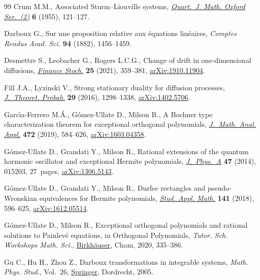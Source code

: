 \begin{thebibliography}{99}
Crum M.M., Associated {S}turm--{L}iouville systems,
 \href{https://doi.org/10.1093/qmath/6.1.121}{\textit{Quart.~J. Math. Oxford
 Ser.~(2)}} \textbf{6} (1955), 121--127.

Darboux G., Sur une proposition relative aux \'equations lin\'eaires,
 \textit{Comptes Rendus Acad. Sci.} \textbf{94} (1882), 1456--1459.

Desmettre S., Leobacher G., Rogers L.C.G., Change of drift in one-dimensional
 diffusions, \href{https://doi.org/10.1007/s00780-021-00451-w}{\textit{Finance
 Stoch.}} \textbf{25} (2021), 359--381,
 \href{http://arxiv.org/abs/1910.11904}{arXiv:1910.11904}.

Fill J.A., Lyzinski V., Strong stationary duality for diffusion processes,
 \href{https://doi.org/10.1007/s10959-015-0612-1}{\textit{J.~Theoret.
 Probab.}} \textbf{29} (2016), 1298--1338,
 \href{http://arxiv.org/abs/1402.5706}{arXiv:1402.5706}.

Garc\'{\i}a-Ferrero M.{\'A}., G\'omez-Ullate D., Milson R., A {B}ochner type
 characterization theorem for exceptional orthogonal polynomials,
 \href{https://doi.org/10.1016/j.jmaa.2018.11.042}{\textit{J.~Math. Anal.
 Appl.}} \textbf{472} (2019), 584--626,
 \href{http://arxiv.org/abs/1603.04358}{arXiv:1603.04358}.

G\'omez-Ullate D., Grandati Y., Milson R., Rational extensions of the quantum
 harmonic oscillator and exceptional {H}ermite polynomials,
 \href{https://doi.org/10.1088/1751-8113/47/1/015203}{\textit{J.~Phys.~A}}
 \textbf{47} (2014), 015203, 27~pages,
 \href{http://arxiv.org/abs/1306.5143}{arXiv:1306.5143}.

G\'omez-Ullate D., Grandati Y., Milson R., Durfee rectangles and
 pseudo-{W}ronskian equivalences for {H}ermite polynomials,
 \href{https://doi.org/10.1111/sapm.12225}{\textit{Stud. Appl. Math.}}
 \textbf{141} (2018), 596--625,
 \href{http://arxiv.org/abs/1612.05514}{arXiv:1612.05514}.

G\'omez-Ullate D., Milson R., Exceptional orthogonal polynomials and rational
 solutions to {P}ainlev\'e equations, in Orthogonal {P}olynomials, \textit{Tutor. Sch. Workshops Math. Sci.},
 \href{https://doi.org/10.1007/978-3-030-36744-2_15}{Birkh\"auser}, Cham,
 2020, 335--386.

Gu C., Hu H., Zhou Z., Darboux transformations in integrable systems,
 \textit{Math. Phys. Stud.}, Vol.~26,
 \href{https://doi.org/10.1007/1-4020-3088-6}{Springer}, Dordrecht, 2005.


\end{thebibliography}
